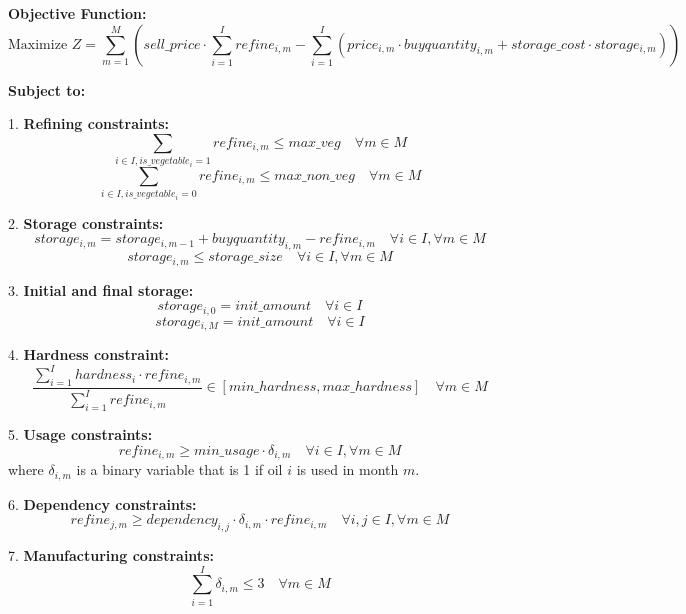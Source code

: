 \documentclass{article}
\begin{document}
\textbf{Objective Function:}
\[
\text{Maximize } Z = \sum_{m=1}^{M} \left( sell\_price \cdot \sum_{i=1}^{I} refine_{i,m} - \sum_{i=1}^{I} (price_{i,m} \cdot buyquantity_{i,m} + storage\_cost \cdot storage_{i,m}) \right)
\]

\textbf{Subject to:}

1. \textbf{Refining constraints:}
\[
\sum_{i \in I, is\_vegetable_{i} = 1} refine_{i,m} \leq max\_veg \quad \forall m \in M
\]
\[
\sum_{i \in I, is\_vegetable_{i} = 0} refine_{i,m} \leq max\_non\_veg \quad \forall m \in M
\]

2. \textbf{Storage constraints:}
\[
storage_{i,m} = storage_{i,m-1} + buyquantity_{i,m} - refine_{i,m} \quad \forall i \in I, \forall m \in M
\]
\[
storage_{i,m} \leq storage\_size \quad \forall i \in I, \forall m \in M
\]

3. \textbf{Initial and final storage:}
\[
storage_{i,0} = init\_amount \quad \forall i \in I
\]
\[
storage_{i,M} = init\_amount \quad \forall i \in I
\]

4. \textbf{Hardness constraint:}
\[
\frac{\sum_{i=1}^{I} hardness_{i} \cdot refine_{i,m}}{\sum_{i=1}^{I} refine_{i,m}} \in [min\_hardness, max\_hardness] \quad \forall m \in M
\]

5. \textbf{Usage constraints:}
\[
refine_{i,m} \geq min\_usage \cdot \delta_{i,m} \quad \forall i \in I, \forall m \in M
\]
where \( \delta_{i,m} \) is a binary variable that is 1 if oil \( i \) is used in month \( m \).

6. \textbf{Dependency constraints:}
\[
refine_{j,m} \geq dependency_{i,j} \cdot \delta_{i,m} \cdot refine_{i,m} \quad \forall i, j \in I, \forall m \in M
\]

7. \textbf{Manufacturing constraints:}
\[
\sum_{i=1}^{I} \delta_{i,m} \leq 3 \quad \forall m \in M
\]
\end{document}
